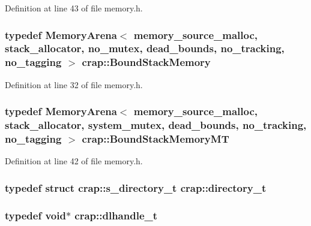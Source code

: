 Definition at line 43 of file memory.\+h.

\hypertarget{namespacecrap_af1fa4a94e1cfd326b0c488a328e154a3}{
\subsubsection[{Bound\+Stack\+Memory}]{\setlength{\rightskip}{0pt plus 5cm}typedef {\bf Memory\+Arena}$<$ {\bf memory\+\_\+source\+\_\+malloc}, {\bf stack\+\_\+allocator}, {\bf no\+\_\+mutex}, {\bf dead\+\_\+bounds}, {\bf no\+\_\+tracking}, {\bf no\+\_\+tagging} $>$ {\bf crap\+::\+Bound\+Stack\+Memory}}}\label{namespacecrap_af1fa4a94e1cfd326b0c488a328e154a3}


Definition at line 32 of file memory.\+h.

\hypertarget{namespacecrap_a9e4f3d9be875850166fb480763ce7abb}{
\subsubsection[{Bound\+Stack\+Memory\+M\+T}]{\setlength{\rightskip}{0pt plus 5cm}typedef {\bf Memory\+Arena}$<$ {\bf memory\+\_\+source\+\_\+malloc}, {\bf stack\+\_\+allocator}, {\bf system\+\_\+mutex}, {\bf dead\+\_\+bounds}, {\bf no\+\_\+tracking}, {\bf no\+\_\+tagging} $>$ {\bf crap\+::\+Bound\+Stack\+Memory\+M\+T}}}\label{namespacecrap_a9e4f3d9be875850166fb480763ce7abb}


Definition at line 42 of file memory.\+h.

\hypertarget{namespacecrap_a82911918170604f7fc9e93d66891069c}{
\subsubsection[{directory\+\_\+t}]{\setlength{\rightskip}{0pt plus 5cm}typedef struct {\bf crap\+::s\+\_\+directory\+\_\+t}
 {\bf crap\+::directory\+\_\+t}}}\label{namespacecrap_a82911918170604f7fc9e93d66891069c}
\hypertarget{namespacecrap_acee8e66495f007816233ce6b2da6465b}{
\subsubsection[{dlhandle\+\_\+t}]{\setlength{\rightskip}{0pt plus 5cm}typedef void$\ast$ {\bf crap\+::dlhandle\+\_\+t}}}\label{namespacecrap_acee8e66495f007816233ce6b2da6465b}


